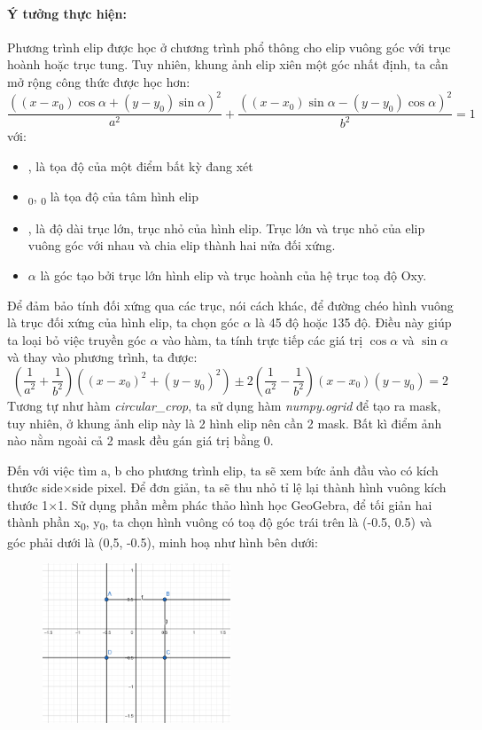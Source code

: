 \documentclass[]{article}
\begin{document}
\paragraph{Ý tưởng thực hiện:} Phương trình elip được học ở chương trình phổ thông cho elip vuông góc với trục hoành hoặc trục tung. Tuy nhiên, khung ảnh elip xiên một góc nhất định, ta cần mở rộng công thức được học hơn:
\[ \frac{((x-x_0)\cos \alpha + (y-y_0) \sin \alpha)^2}{a^2} + \frac{((x-x_0)\sin \alpha - (y-y_0) \cos \alpha)^2}{b^2}= 1 \]
với:
\begin{itemize}
  \item {},  là tọa độ của một điểm bất kỳ đang xét
  \item {}\textsubscript 0, \textsubscript 0 là tọa độ của tâm hình elip
  \item {},  là độ dài trục lớn, trục nhỏ của hình elip. Trục lớn và trục nhỏ của elip vuông góc với nhau và chia elip thành hai nửa đối xứng.
  \item $\alpha$ là góc tạo bởi trục lớn hình elip và trục hoành của hệ trục toạ độ Oxy.
\end{itemize}
Để đảm bảo tính đối xứng qua các trục, nói cách khác, để đường chéo hình vuông là trục đối xứng của hình elip, ta chọn góc $\alpha$ là 45 độ hoặc 135 độ. Điều này giúp ta loại bỏ việc truyền góc $\alpha$ vào hàm, ta tính trực tiếp các giá trị $\cos \alpha$ và $\sin \alpha$ và thay vào phương trình, ta được:
\begin{equation}
  (\frac{1}{a^2} + \frac{1}{b^2})((x-x_0)^2 + (y-y_0)^2) \pm 2(\frac{1}{a^2} - \frac{1}{b^2})(x-x_0) (y-y_0) = 2
  \label{eq:elip}
\end{equation}
Tương tự như hàm \textit{circular\_crop}, ta sử dụng hàm \textit{numpy.ogrid} để tạo ra mask, tuy nhiên, ở khung ảnh elip này là 2 hình elip nên cần 2 mask. Bất kì điểm ảnh nào nằm ngoài cả 2 mask đều gán giá trị bằng 0. \par
Đến với việc tìm a, b cho phương trình elip, ta sẽ xem bức ảnh đầu vào có kích thước side$\times$side pixel. Để đơn giản, ta sẽ thu nhỏ tỉ lệ lại thành hình vuông kích thước 1$\times$1. Sử dụng phần mềm phác thảo hình học GeoGebra, để tối giản hai thành phần x\textsubscript 0, y\textsubscript 0, ta chọn hình vuông có toạ độ góc trái trên là (-0.5, 0.5) và góc phải dưới là (0,5, -0.5), minh hoạ như hình bên dưới:
\begin{figure}[!ht]
  \centering
  \includegraphics[width = 0.5\textwidth]{image/square_illustrator.png}
\end{figure} \par 
\end{document}
